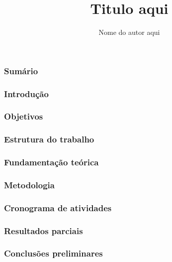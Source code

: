 \documentclass{beamer}
\title[Subtitulo aqui]{Titulo aqui}
\author{Nome do autor aqui}
\institute[Sigla opcional]
{
Nome da instituição aqui \\
\medskip
\textit{email aqui}
}
\date{}
\begin{document}
\begin{frame}
\titlepage
\end{frame}

\begin{frame}
    \frametitle{Sumário}
    \tableofcontents
\end{frame}


\begin{frame}
\frametitle{Introdução}

\end{frame}

\begin{frame}
\frametitle{Objetivos}

\end{frame}

\begin{frame}
\frametitle{Estrutura do trabalho}

\end{frame}

\begin{frame}
\frametitle{Fundamentação teórica}

\end{frame}

\begin{frame}
\frametitle{Metodologia}

\end{frame}

\begin{frame}
\frametitle{Cronograma de atividades}

\end{frame}

\begin{frame}
\frametitle{Resultados parciais}

\end{frame}

\begin{frame}
\frametitle{Conclusões preliminares}

\end{frame}
\end{document}
